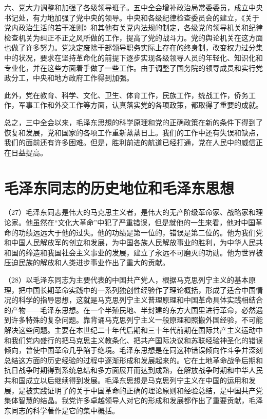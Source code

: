 六、党大力调整和加强了各级领导班子。五中全会增补政治局常委委员，成立中央书记处，有力地加强了党中央的领导。中央和各级纪律检查委员会的建立，《关于党内政治生活的若干准则》和其他有关党内法规的制定，各级党的领导机关和纪律检查机关为纠正不正之风所做的工作，提高了党的战斗力。党的舆论机关在这方面也做了许多努力。党决定废除干部领导职务实际上存在的终身制，改变权力过分集中的状况，要求在坚持革命化的前提下逐步实现各级领导人员的年轻化、知识化和专业化，并在这些方面着手做了一些工作。由于调整了国务院的领导成员和实行党政分工，中央和地方政府工作得到加强。

此外，党在教育、科学、文化、卫生、体育工作，民族工作，统战工作，侨务工作，军事工作和外交工作等方面，认真落实党的各项政策，都取得了重要的成就。

总之，三中全会以来，毛泽东思想的科学原理和党的正确政策在新的条件下得到了恢复和发展，党和国家的各项工作重新蒸蒸日上。我们的工作中还有失误和缺点，我们的面前还有许多困难。但是，胜利前进的航道已经打通，党在人民中的威信正在日益提高。

\section{毛泽东同志的历史地位和毛泽东思想}

（27）毛泽东同志是伟大的马克思主义者，是伟大的无产阶级革命家、战略家和理论家。他虽然在“文化大革命”中犯了严重错误，但是就他的一生来看，他对中国革命的功绩远远大于他的过失。他的功绩是第一位的，错误是第二位的。他为我们党和中国人民解放军的创立和发展，为中国各族人民解放事业的胜利，为中华人民共和国的缔造和我国社会主义事业的发展，建立了永远不可磨灭的功勋。他为世界被压迫民族的解放和人类进步事业作出了重大的贡献。

（28）以毛泽东同志为主要代表的中国共产党人，根据马克思列宁主义的基本原理，把中国长期革命实践中的一系列独创性经验作了理论概括，形成了适合中国情况的科学的指导思想，这就是马克思列宁主义普理原理和中国革命具体实践相结合的产物——毛泽东思想。在一个半殖民地、半封建的东方大国里进行革命，必然遇到许多特殊的复杂问题。靠背诵马克思列宁主义一般原理和照搬外国经验，不可能解决这些问题。主要在本世纪二十年代后期和三十年代前期在国际共产主义运动中和我们党内盛行的把马克思主义教条化、把共产国际决议和苏联经验神圣化的错误倾向，曾使中国革命几乎陷于绝境。毛泽东思想是在同这种错误倾向作斗争并深刻总结这方面的历史经验的过程中逐渐形成和发展起来的。它在土地革命战争后期和抗日战争时期得到系统总结和多方面展开而达到成熟，在解放战争时期和中华人民共和国成立以后继续得到发展。毛泽东思想是马克思列宁主义在中国的运用和发展，是被实践证明了的关于中国革命的正确的理论原则和经验总结，是中国共产党集体智慧的结晶。我党许多卓越领导人对它的形成和发展都作出了重要贡献，毛泽东同志的科学著作是它的集中概括。

